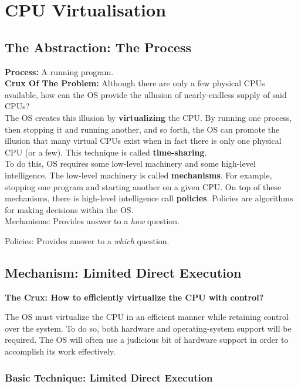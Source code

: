 \chapter{CPU Virtualisation}

\section{The Abstraction: The Process}

\textbf{Process:} A running program.\\

\textbf{Crux Of The Problem:} Although there are only a few physical CPUs
available, how can the OS provide the ullusion of nearly-endless supply of 
said CPUs?\\

The OS creates this illusion by \textbf{virtualizing} the CPU. By running
one process, then stopping it and running another, and so forth, the OS can
promote the illusion that many virtual CPUs exist when in fact there is only
one physical CPU (or a few). This technique is called \textbf{time-sharing}.\\

To do this, OS requires some low-level machinery and some
high-level intelligence. The low-level machinery is called \textbf{mechanisms}.
For example, stopping one program and starting another on a given CPU. On top
of these mechanisms, there is high-level intelligence call \textbf{policies}.
Policies are algorithms for making decisions within the OS.\\

Mechanisms: Provides answer to a \textit{how} question.

Policies: Provides answer to a \textit{which} question.\\

\section{Mechanism: Limited Direct Execution}

\textbf{The Crux: How to efficiently virtualize the CPU with control?}

The OS must virtualize the CPU in an efficient manner while retaining control
over the system. To do so, both hardware and operating-system support will be
required. The OS will often use a judicious bit of hardware support in order to
accomplish its work effectively.

\subsection{Basic Technique: Limited Direct Execution}

